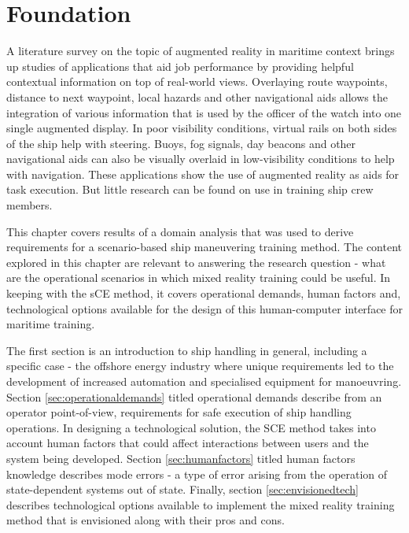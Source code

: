 \chapter{Foundation}

A literature survey on the topic of augmented reality in maritime context brings up studies of applications that aid job performance by providing helpful contextual information on top of real-world views. Overlaying route waypoints, distance to next waypoint, local hazards and other navigational aids allows the integration of various information that is used by the officer of the watch into one single augmented display. In poor visibility conditions, virtual rails on both sides of the ship help with steering. Buoys, fog signals, day beacons and other navigational aids can also be visually overlaid in low-visibility conditions to help with navigation. These applications show the use of augmented reality as aids for task execution. But little research can be found on use in training ship crew members.

This chapter covers results of a domain analysis that was used to derive requirements for a scenario-based ship maneuvering training method. The content explored in this chapter are relevant to answering the research question - what are the operational scenarios in which mixed reality training could be useful. In keeping with the sCE method, it covers operational demands, human factors and, technological options available for the design of this human-computer interface for maritime training. 

The first section is an introduction to ship handling in general, including a specific case - the offshore energy industry where unique requirements led to the development of increased automation and specialised equipment for manoeuvring. Section \ref{sec:operationaldemands} titled operational demands describe from an operator point-of-view, requirements for safe execution of ship handling operations. In designing a technological solution, the SCE method takes into account human factors that could affect interactions between users and the system being developed. Section \ref{sec:humanfactors} titled human factors knowledge describes mode errors - a type of error arising from the operation of state-dependent systems out of state. Finally, section \ref{sec:envisionedtech} describes technological options available to implement the mixed reality training method that is envisioned along with their pros and cons.



